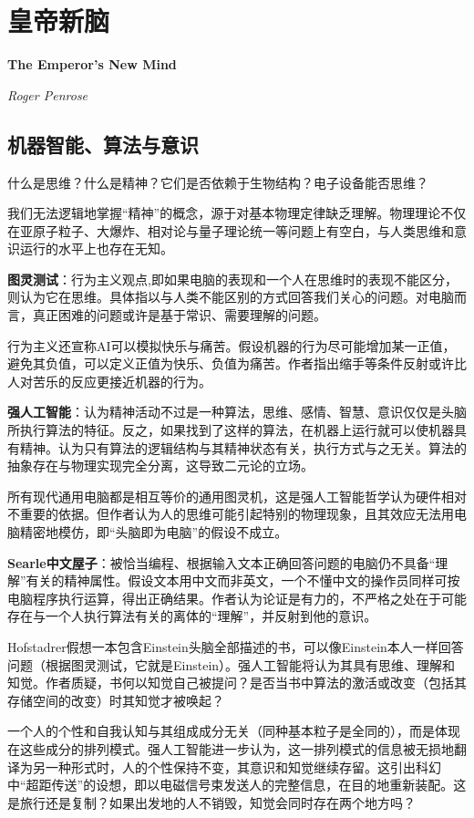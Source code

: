 
\chapter{皇帝新脑}
\Large\textbf{The Emperor's New Mind}
\par \emph{Roger Penrose} \normalsize

\section{机器智能、算法与意识}

\par 什么是思维？什么是精神？它们是否依赖于生物结构？电子设备能否思维？

\par 我们无法逻辑地掌握“精神”的概念，源于对基本物理定律缺乏理解。物理理论不仅在亚原子粒子、大爆炸、相对论与量子理论统一等问题上有空白，与人类思维和意识运行的水平上也存在无知。

\par \textbf{图灵测试}：行为主义观点,即如果电脑的表现和一个人在思维时的表现不能区分，则认为它在思维。具体指以与人类不能区别的方式回答我们关心的问题。对电脑而言，真正困难的问题或许是基于常识、需要理解的问题。

\par 行为主义还宣称AI可以模拟快乐与痛苦。假设机器的行为尽可能增加某一正值，避免其负值，可以定义正值为快乐、负值为痛苦。作者指出缩手等条件反射或许比人对苦乐的反应更接近机器的行为。

\par \textbf{强人工智能}：认为精神活动不过是一种算法，思维、感情、智慧、意识仅仅是头脑所执行算法的特征。反之，如果找到了这样的算法，在机器上运行就可以使机器具有精神。认为只有算法的逻辑结构与其精神状态有关，执行方式与之无关。算法的抽象存在与物理实现完全分离，这导致二元论的立场。

\par 所有现代通用电脑都是相互等价的通用图灵机，这是强人工智能哲学认为硬件相对不重要的依据。但作者认为人的思维可能引起特别的物理现象，且其效应无法用电脑精密地模仿，即“头脑即为电脑”的假设不成立。

\par \textbf{Searle中文屋子}：被恰当编程、根据输入文本正确回答问题的电脑仍不具备“理解”有关的精神属性。假设文本用中文而非英文，一个不懂中文的操作员同样可按电脑程序执行运算，得出正确结果。作者认为论证是有力的，不严格之处在于可能存在与一个人执行算法有关的离体的“理解”，并反射到他的意识。

\par Hofstadrer假想一本包含Einstein头脑全部描述的书，可以像Einstein本人一样回答问题（根据图灵测试，它就是Einstein）。强人工智能将认为其具有思维、理解和知觉。作者质疑，书何以知觉自己被提问？是否当书中算法的激活或改变（包括其存储空间的改变）时其知觉才被唤起？

\par 一个人的个性和自我认知与其组成成分无关（同种基本粒子是全同的），而是体现在这些成分的排列模式。强人工智能进一步认为，这一排列模式的信息被无损地翻译为另一种形式时，人的个性保持不变，其意识和知觉继续存留。这引出科幻中“超距传送”的设想，即以电磁信号束发送人的完整信息，在目的地重新装配。这是旅行还是复制？如果出发地的人不销毁，知觉会同时存在两个地方吗？